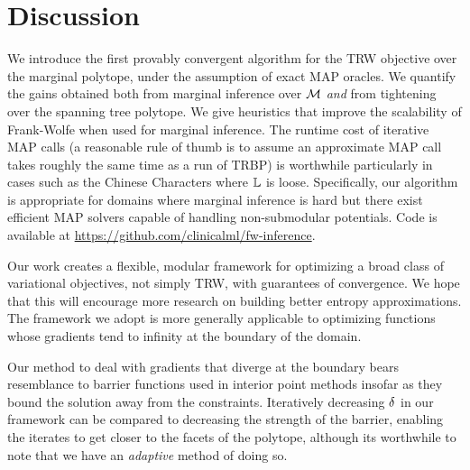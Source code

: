 \vspace{-2mm}
\section{Discussion}
\vspace{-3mm}
We introduce the first provably convergent
algorithm for the TRW objective over the marginal polytope, 
under the assumption of exact MAP oracles.
%
%
We quantify the gains obtained both from marginal inference over $\mathcal{M}$ \textit{and} from tightening
over the spanning tree polytope. 
%
%
We give heuristics that improve the scalability of Frank-Wolfe
when used for marginal inference.
The runtime cost of iterative MAP calls (a reasonable rule of thumb is to assume 
an approximate MAP call takes roughly the same time as a run of TRBP) is worthwhile particularly in 
%
%
cases such as the Chinese Characters where $\mathbb{L}$ is loose. 
Specifically, our algorithm is appropriate for domains where marginal inference is hard but there exist
efficient MAP solvers capable of handling non-submodular potentials.
Code is available at {\small \url{https://github.com/clinicalml/fw-inference}}. 

Our work creates a flexible, modular framework for optimizing a broad
class of variational objectives, not simply TRW, with guarantees of convergence. We hope that this
will encourage more research on building better entropy approximations.
%
%
%
The framework we adopt is more generally applicable
to optimizing functions whose gradients tend to infinity at the boundary of the
domain.
%
%

%
%
%
%

Our method to deal with gradients that diverge at the boundary
bears resemblance to barrier functions used in interior point methods insofar as they bound
the solution away from the constraints. Iteratively decreasing $\delta$ in our framework
can be compared to decreasing the strength of the barrier, enabling the iterates to get closer to the
facets of the polytope, although its worthwhile to note that we have an \emph{adaptive} method of doing so.
